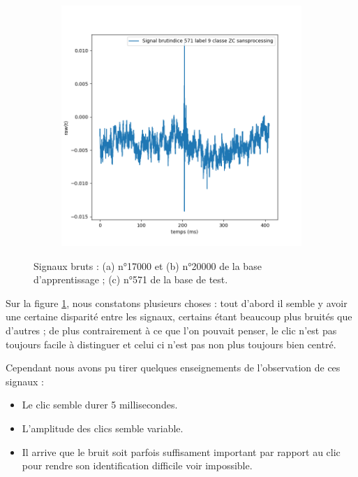 \begin{figure}[!h]
\begin{subfigure}[b]{0.3\textwidth}
	\caption{}
  	\end{subfigure}
  	\begin{subfigure}[b]{0.3\textwidth}
    \includegraphics[width=\textwidth]{./images/indice571Spectro1Dlabel9classeZCsansprocessingsanszoom.png}
    	\caption{}
	\end{subfigure}
\caption{Signaux bruts : (a) n°17000 et (b) n°20000 de la base d'apprentissage ; (c) n°571 de la base de test.%
\label{fig:signauxbruts}}
\end{figure}

Sur la figure \ref{fig:signauxbruts}, nous constatons plusieurs choses : tout d'abord il semble y avoir une certaine disparité entre les signaux, certains étant beaucoup plus bruités que d'autres ; de plus contrairement à ce que l'on pouvait penser, le clic n'est pas toujours facile à distinguer et celui ci n'est pas non plus toujours bien centré.

Cependant nous avons pu tirer quelques enseignements de l'observation de ces signaux :
\begin{itemize}
\item Le clic semble durer 5 millisecondes.
\item L'amplitude des clics semble variable.
\item Il arrive que le bruit soit parfois suffisament important par rapport au clic pour rendre son identification difficile voir impossible.
\end{itemize}

